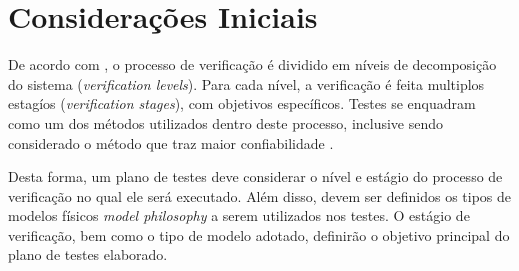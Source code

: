 
\section{Considerações Iniciais} \label{sec:consideracoes}

De acordo com \textcite{ecss-e-st-10-02}, o processo de verificação é dividido em níveis de decomposição do sistema (\textit{verification levels}). Para cada nível, a verificação é feita multiplos estagíos (\textit{verification stages}), com objetivos específicos.
Testes se enquadram como um dos métodos utilizados dentro deste processo, inclusive sendo considerado o método que traz maior confiabilidade \cite{ecss-e-st-10-02}.

Desta forma, um plano de testes deve considerar o nível e estágio do processo de verificação no qual ele será executado.
Além disso, devem ser definidos os tipos de modelos físicos \textit{model philosophy} a serem utilizados nos testes.
O estágio de verificação, bem como o tipo de modelo adotado, definirão o objetivo principal do plano de testes elaborado.

